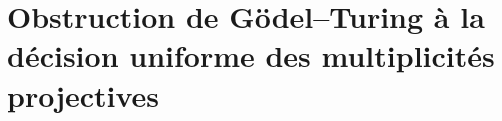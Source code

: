 \chapter{Obstruction de Gödel--Turing à la décision uniforme des multiplicités projectives}
\label{chap:p3-final:54:godel_turing}

